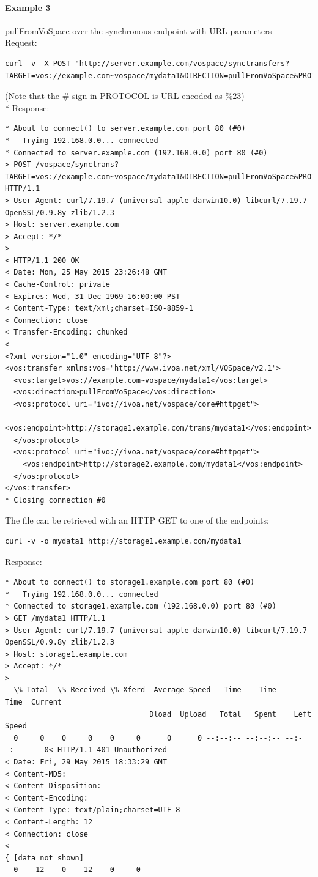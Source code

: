 \documentclass[11pt,a4paper]{ivoa}
\begin{document}
\paragraph{Example 3}
pullFromVoSpace over the synchronous endpoint with URL parameters
\\[5px]
\noindent
Request:
\begin{lstlisting}
curl -v -X POST "http://server.example.com/vospace/synctransfers?TARGET=vos://example.com~vospace/mydata1&DIRECTION=pullFromVoSpace&PROTOCOL=ivo://ivoa.net/vospace/core%23httpget"
\end{lstlisting}
(Note that the \# sign in PROTOCOL is URL encoded as \%23) \\*
Response:
\begin{lstlisting}
* About to connect() to server.example.com port 80 (#0)
*   Trying 192.168.0.0... connected
* Connected to server.example.com (192.168.0.0) port 80 (#0)
> POST /vospace/synctrans?TARGET=vos://example.com~vospace/mydata1&DIRECTION=pullFromVoSpace&PROTOCOL=ivo://ivoa.net/vospace/core\%23httpget HTTP/1.1
> User-Agent: curl/7.19.7 (universal-apple-darwin10.0) libcurl/7.19.7 OpenSSL/0.9.8y zlib/1.2.3
> Host: server.example.com
> Accept: */*
>
< HTTP/1.1 200 OK
< Date: Mon, 25 May 2015 23:26:48 GMT
< Cache-Control: private
< Expires: Wed, 31 Dec 1969 16:00:00 PST
< Content-Type: text/xml;charset=ISO-8859-1
< Connection: close
< Transfer-Encoding: chunked
<
<?xml version="1.0" encoding="UTF-8"?>
<vos:transfer xmlns:vos="http://www.ivoa.net/xml/VOSpace/v2.1">
  <vos:target>vos://example.com~vospace/mydata1</vos:target>
  <vos:direction>pullFromVoSpace</vos:direction>
  <vos:protocol uri="ivo://ivoa.net/vospace/core#httpget">
    <vos:endpoint>http://storage1.example.com/trans/mydata1</vos:endpoint>
  </vos:protocol>
  <vos:protocol uri="ivo://ivoa.net/vospace/core#httpget">
    <vos:endpoint>http://storage2.example.com/mydata1</vos:endpoint>
  </vos:protocol>
</vos:transfer>
* Closing connection #0
\end{lstlisting}
The file can be retrieved with an HTTP GET to one of the endpoints:
\begin{lstlisting}
curl -v -o mydata1 http://storage1.example.com/mydata1
\end{lstlisting}
Response:
\begin{lstlisting}
* About to connect() to storage1.example.com port 80 (#0)
*   Trying 192.168.0.0... connected
* Connected to storage1.example.com (192.168.0.0) port 80 (#0)
> GET /mydata1 HTTP/1.1
> User-Agent: curl/7.19.7 (universal-apple-darwin10.0) libcurl/7.19.7 OpenSSL/0.9.8y zlib/1.2.3
> Host: storage1.example.com
> Accept: */*
>
  \% Total  \% Received \% Xferd  Average Speed   Time    Time     Time  Current
                                 Dload  Upload   Total   Spent    Left  Speed
  0     0    0     0    0     0      0      0 --:--:-- --:--:-- --:--:--     0< HTTP/1.1 401 Unauthorized
< Date: Fri, 29 May 2015 18:33:29 GMT
< Content-MD5:
< Content-Disposition:
< Content-Encoding:
< Content-Type: text/plain;charset=UTF-8
< Content-Length: 12
< Connection: close
<
{ [data not shown]
  0    12    0    12    0     0   
 \end{lstlisting}
\end{document}
